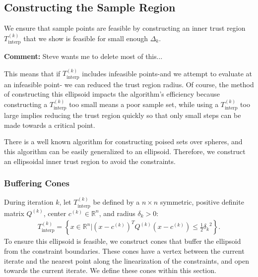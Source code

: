 \documentclass{article}
\newenvironment{comment}
  {\par\medskip
   \color{red}%
   \begin{framed}
   \textbf{Comment: }\ignorespaces}
 {\end{framed}
  \medskip}
\theoremstyle{case}
\numberwithin{theorem}{subsection}
\newcommand{\ck}{{c^{(k)}}}
\newcommand{\dk}{\Delta_k}
\newcommand{\qk}{{Q^{(k)}}}
\newcommand{\Rn}{\mathbb R^n}
\newcommand{\sampletrk}{{T_{\text{interp}}^{(k)}}}
\newcommand{\sdk}{{\delta_k}}
\begin{document}
\subsection{Constructing the Sample Region}
\label{possible_ellipsoids}

We ensure that sample points are feasible by constructing an inner trust region $\sampletrk$ that we show is feasible for small enough $\dk$.
\begin{comment}
Steve wants me to delete most of this...
\end{comment}
This means that if $\sampletrk$ includes infeasible points-and we attempt to evaluate at an infeasible point- we can reduced the trust region radius.
Of course, the method of constructing this ellipsoid impacts the algorithm's efficiency because constructing a $\sampletrk$ too small means a poor sample set,
while using a $\sampletrk$ too large implies reducing the trust region quickly so that only small steps can be made towards a critical point.

There is a well known algorithm for constructing poised sets over spheres, and this algorithm can be easily generalized to an ellipsoid.
Therefore, we construct an ellipsoidal inner trust region to avoid the constraints.


\subsubsection{Buffering Cones}
\label{ellipsoid_requirements}
During iteration $k$, let $\sampletrk$ be defined by a $n\times n$ symmetric, positive definite matrix $\qk$, center $\ck \in \Rn$, and radius $\delta_{k} > 0$:
\begin{align}
\sampletrk = \left \{x \in \Rn | (x - \ck)^T \qk(x - \ck) \le \frac 1 2 \sdk^2 \right \}. \label{define_sampletrk}
\end{align}
To ensure this ellipsoid is feasible, we construct cones that buffer the ellipsoid from the constraint boundaries.
These cones have a vertex between the current iterate and the nearest point along the linearization of the constraints, and open towards the current iterate.
We define these cones within this section.
\end{document}
